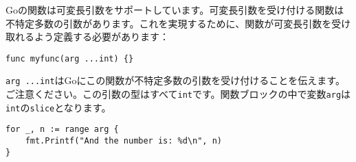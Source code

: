 Goの関数は可変長引数をサポートしています。可変長引数を受け付ける関数は不特定多数の引数があります。これを実現するために、関数が可変長引数を受け取れるよう定義する必要があります：

\begin{lstlisting}[numbers=none]
func myfunc(arg ...int) {}
\end{lstlisting}

\texttt{arg ...int}はGoにこの関数が不特定多数の引数を受け付けることを伝えます。ご注意ください。この引数の型はすべて\texttt{int}です。関数ブロックの中で変数\texttt{arg}は\texttt{int}の\texttt{slice}となります。

\begin{lstlisting}[numbers=none]
for _, n := range arg {
    fmt.Printf("And the number is: %d\n", n)
}
\end{lstlisting}


